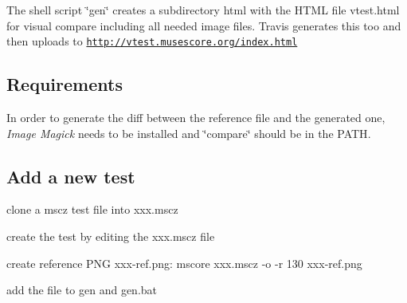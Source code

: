 The shell script \char`\"{}gen\char`\"{} creates a subdirectory {\ttfamily html} with the H\+T\+ML file {\ttfamily vtest.\+html} for visual compare including all needed image files. Travis generates this too and then uploads to \href{http://vtest.musescore.org/index.html}{\tt http\+://vtest.\+musescore.\+org/index.\+html}

\subsection*{Requirements }

In order to generate the diff between the reference file and the generated one, {\itshape Image Magick} needs to be installed and \char`\"{}compare\char`\"{} should be in the {\ttfamily P\+A\+TH}.

\subsection*{Add a new test }


\begin{DoxyItemize}
\item clone a mscz test file into {\ttfamily xxx.\+mscz}
\item create the test by editing the {\ttfamily xxx.\+mscz} file
\item create reference P\+NG {\ttfamily xxx-\/ref.\+png}\+: mscore xxx.\+mscz -\/o -\/r 130 xxx-\/ref.\+png
\item add the file to {\ttfamily gen} and {\ttfamily gen.\+bat} 
\end{DoxyItemize}